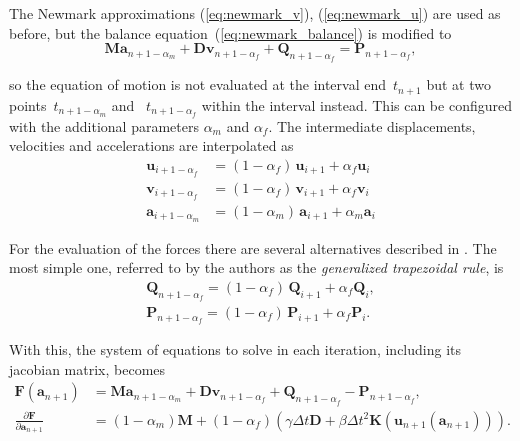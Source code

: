 The Newmark approximations (\ref{eq:newmark_v}), (\ref{eq:newmark_u}) are used as before, but the balance equation~(\ref{eq:newmark_balance}) is modified to
%
\begin{equation}
\boldsymbol{M}\boldsymbol{a}_{n+1-\alpha_m} + \boldsymbol{D}\mathbf{v}_{n+1-\alpha_f} + \boldsymbol{Q}_{n+1-\alpha_f} = \boldsymbol{P}_{n+1-\alpha_f},
\end{equation}

so the equation of motion is not evaluated at the interval end~$t_{n+1}$ but at two points~$t_{n+1-\alpha_m}$ and~ $t_{n+1-\alpha_f}$ within the interval instead.
This can be configured with the additional parameters $\alpha_{m}$ and $\alpha_{f}$.
The intermediate displacements, velocities and accelerations are interpolated as
%
\begin{align}
\boldsymbol{u}_{i+1-\alpha_f} &= (1 - \alpha_f)\,\boldsymbol{u}_{i+1} + \alpha_f\boldsymbol{u}_{i} \\
\mathbf{v}_{i+1-\alpha_f} &= (1 - \alpha_f)\,\mathbf{v}_{i+1} + \alpha_f\mathbf{v}_{i} \\
\boldsymbol{a}_{i+1-\alpha_m} &= (1 - \alpha_m)\,\boldsymbol{a}_{i+1} + \alpha_m\boldsymbol{a}_{i}
\end{align}

For the evaluation of the forces there are several alternatives described in \cite{bib:erlicher2002}.
The most simple one, referred to by the authors as the \textit{generalized trapezoidal rule}, is
%
\begin{align}
\boldsymbol{Q}_{n+1-\alpha_f} =  (1 - \alpha_f)\,\boldsymbol{Q}_{i+1} + \alpha_f\boldsymbol{Q}_{i}, \\
\boldsymbol{P}_{n+1-\alpha_f} =  (1 - \alpha_f)\,\boldsymbol{P}_{i+1} + \alpha_f\boldsymbol{P}_{i}.
\end{align}

With this, the system of equations to solve in each iteration, including its jacobian matrix, becomes
%
\begin{align}
\boldsymbol{F}(\boldsymbol{a}_{n+1}) &= \boldsymbol{M}\boldsymbol{a}_{n+1-\alpha_m} + \boldsymbol{D}\mathbf{v}_{n+1-\alpha_f} + \boldsymbol{Q}_{n+1-\alpha_f} - \boldsymbol{P}_{n+1-\alpha_f}, \\
\frac{\partial \boldsymbol{F}}{\partial \boldsymbol{a}_{n+1}} &= (1 - \alpha_m)\boldsymbol{M} + (1 - \alpha_f)\left( \gamma \Delta t \boldsymbol{D} + \beta \Delta t^2 \boldsymbol{K}(\boldsymbol{u}_{n+1}(\boldsymbol{a}_{n+1})) \right).
\end{align}

